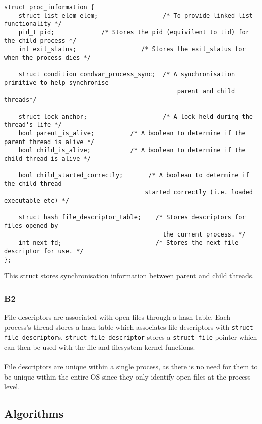 \documentclass[a4wide, 11pt]{article}
\newcommand{\tab}{\hspace*{2em}}
\newcommand{\tx}{\texttt}
\begin{document}
\begin{verbatim}
struct proc_information { 
    struct list_elem elem;                  /* To provide linked list functionality */
    pid_t pid;             /* Stores the pid (equivilent to tid) for the child process */
    int exit_status;                  /* Stores the exit_status for when the process dies */
    
    struct condition condvar_process_sync;  /* A synchronisation primitive to help synchronise 
                                                parent and child threads*/
                                                
    struct lock anchor;                     /* A lock held during the thread's life */
    bool parent_is_alive;          /* A boolean to determine if the parent thread is alive */
    bool child_is_alive;           /* A boolean to determine if the child thread is alive */
    
    bool child_started_correctly;       /* A boolean to determine if the child thread 
                                       started correctly (i.e. loaded executable etc) */
    
    struct hash file_descriptor_table;    /* Stores descriptors for files opened by 
                                            the current process. */ 
    int next_fd;                          /* Stores the next file descriptor for use. */
};
\end{verbatim}

\tab This struct stores synchronisation information between parent and child threads.

\subsubsection{B2}

File descriptors are associated with open files through a hash table. Each process's thread stores a hash table which associates file descriptors with \tx{struct file\_descriptor}s. \tx{struct file\_descriptor} stores a \tx{struct file} pointer which can then be used with the file and filesystem kernel functions.
\\\\
File descriptors are unique within a single process, as there is no need for them to be unique within the entire OS since they only identify open files at the process level.

\subsection{Algorithms}
\end{document}
